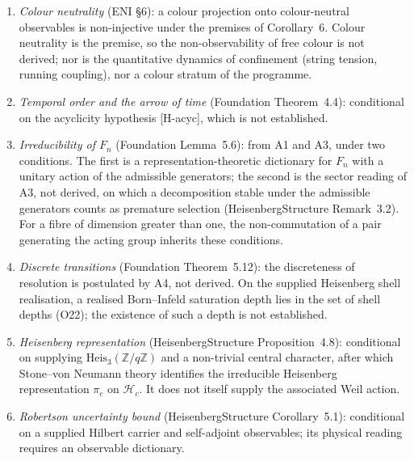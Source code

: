 \documentclass[11pt,a4paper]{article}
\theoremstyle{definition}
\newcommand{\Heis}{\mathrm{Heis}}
\newcommand{\Hc}{\mathcal{H}_c}
\newcommand{\pic}{\pi_c}
\begin{document}
      \begin{enumerate}
        \item \textit{Colour neutrality} (ENI §6):
        a colour projection onto colour-neutral observables is non-injective under the premises of
        Corollary~6.
        Colour neutrality is the premise, so the non-observability of free colour is not derived; nor is
        the quantitative dynamics of confinement (string tension, running coupling), nor a colour stratum
        of the programme.

        \item \textit{Temporal order and the arrow of time} (Foundation Theorem~4.4):
        conditional on the acyclicity hypothesis [H-acyc], which is not established.

        \item \textit{Irreducibility of $F_n$} (Foundation Lemma~5.6): from A1 and A3, under two
        conditions.  The first is a representation-theoretic dictionary for $F_n$ with a unitary action of
        the admissible generators; the second is the sector
        reading of A3, not derived, on which a decomposition stable under the admissible generators
        counts as premature selection (HeisenbergStructure Remark~3.2).
        For a fibre of dimension greater than one, the non-commutation of a pair generating the acting
        group inherits these conditions.

        \item \textit{Discrete transitions} (Foundation Theorem~5.12): the discreteness of resolution
        is postulated by A4, not derived.  On the supplied Heisenberg shell realisation, a realised
        Born--Infeld saturation depth lies in the set of shell depths (O22); the existence of such a
        depth is not established.

        \item \textit{Heisenberg representation} (HeisenbergStructure Proposition~4.8): conditional
        on supplying $\Heis_3(\mathbb{Z}/q\mathbb{Z})$ and a non-trivial central character, after
        which Stone--von Neumann theory identifies the irreducible Heisenberg representation $\pic$
        on $\Hc$.  It does not itself supply the associated Weil action.

        \item \textit{Robertson uncertainty bound} (HeisenbergStructure Corollary~5.1): conditional
        on a supplied Hilbert carrier and self-adjoint observables; its physical reading requires an
        observable dictionary.
      \end{enumerate}
\end{document}
